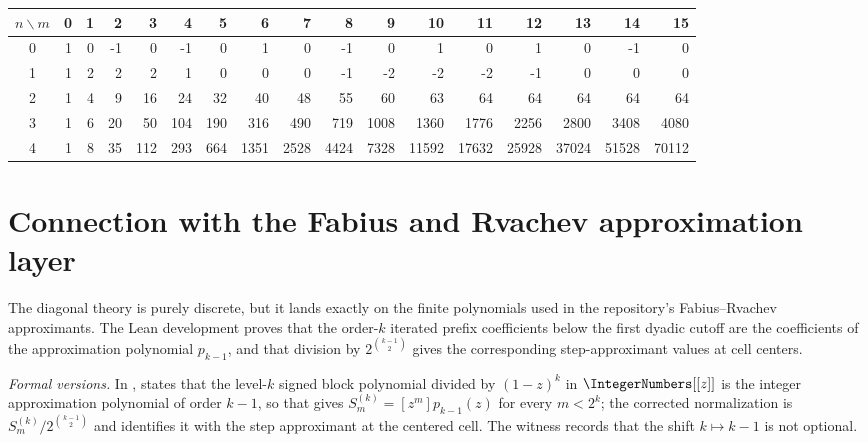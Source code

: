 \documentclass[11pt,oneside]{article}
\numberwithin{equation}{section}
\theoremstyle{definition}
\theoremstyle{remark}
\begin{document}
\begin{center}
\scriptsize
\setlength{\tabcolsep}{3.6pt}
\begin{tabular}{c|rrrrrrrrrrrrrrrr}
\toprule
$n\backslash m$&0&1&2&3&4&5&6&7&8&9&10&11&12&13&14&15\\
\midrule
0&1&0&-1&0&-1&0&1&0&-1&0&1&0&1&0&-1&0\\
1&1&2&2&2&1&0&0&0&-1&-2&-2&-2&-1&0&0&0\\
2&1&4&9&16&24&32&40&48&55&60&63&64&64&64&64&64\\
3&1&6&20&50&104&190&316&490&719&1008&1360&1776&2256&2800&3408&4080\\
4&1&8&35&112&293&664&1351&2528&4424&7328&11592&17632&25928&37024&51528&70112\\
\bottomrule
\end{tabular}
\end{center}
\section{Connection with the Fabius and Rvachev approximation layer}
\label{p3:b:sec:fabius}\label{p3:ch:fabius}

The diagonal theory is purely discrete, but it lands exactly on the finite
polynomials used in the repository's Fabius--Rvachev approximants.  The Lean
development proves that the order-$k$ iterated prefix coefficients below the
first dyadic cutoff are the coefficients of the approximation polynomial
$p_{k-1}$, and that division by $2^{\binom{k-1}{2}}$ gives the corresponding
step-approximant values at cell centers.

\emph{Formal versions.}  In ,
states that the level-$k$ signed block polynomial divided by $(1-z)^k$ in
$\IntegerNumbers[[z]]$ is the integer approximation polynomial
 of order $k-1$, so that
 gives
$S^{(k)}_m=[z^m]p_{k-1}(z)$ for every $m<2^k$; the corrected normalization
 is $S^{(k)}_m/2^{\binom{k-1}2}$
and 
identifies it with the step approximant at the centered cell.  The witness
records that the shift $k\mapsto k-1$ is not optional.
\end{document}
